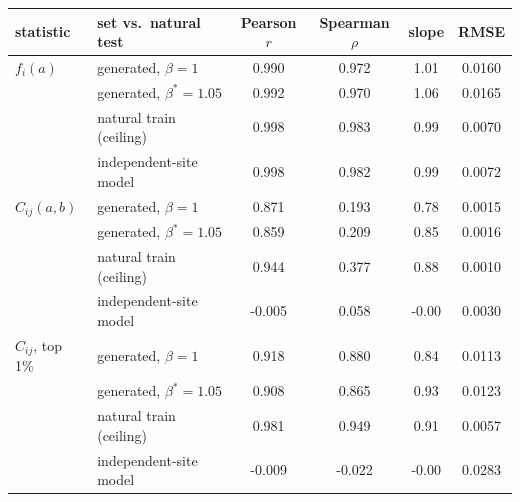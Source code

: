\begin{tabular}{llcccc}
\toprule
statistic & set vs.\ natural test & Pearson $r$ & Spearman $\rho$ & slope & RMSE \\
\midrule
$f_i(a)$ & generated, $\beta=1$ & 0.990 & 0.972 & 1.01 & 0.0160 \\
 & generated, $\beta^*=1.05$ & 0.992 & 0.970 & 1.06 & 0.0165 \\
 & natural train (ceiling) & 0.998 & 0.983 & 0.99 & 0.0070 \\
 & independent-site model & 0.998 & 0.982 & 0.99 & 0.0072 \\
\midrule
$C_{ij}(a,b)$ & generated, $\beta=1$ & 0.871 & 0.193 & 0.78 & 0.0015 \\
 & generated, $\beta^*=1.05$ & 0.859 & 0.209 & 0.85 & 0.0016 \\
 & natural train (ceiling) & 0.944 & 0.377 & 0.88 & 0.0010 \\
 & independent-site model & -0.005 & 0.058 & -0.00 & 0.0030 \\
\midrule
$C_{ij}$, top 1\% & generated, $\beta=1$ & 0.918 & 0.880 & 0.84 & 0.0113 \\
 & generated, $\beta^*=1.05$ & 0.908 & 0.865 & 0.93 & 0.0123 \\
 & natural train (ceiling) & 0.981 & 0.949 & 0.91 & 0.0057 \\
 & independent-site model & -0.009 & -0.022 & -0.00 & 0.0283 \\
\bottomrule
\end{tabular}
